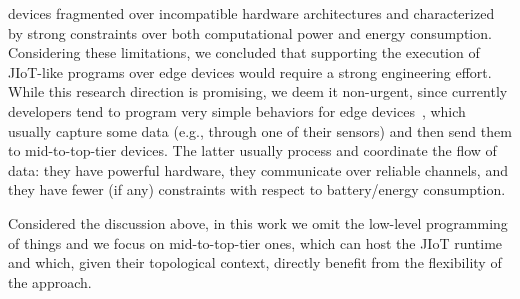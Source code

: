 devices fragmented over incompatible hardware architectures and characterized by
strong constraints over both computational power and energy consumption.
Considering these limitations, we concluded that supporting the execution of
JIoT-like programs over edge devices would require a strong engineering effort.
While this research direction is promising, we deem it non-urgent, since
currently developers tend to program very simple behaviors for edge
devices~\cite{7123563}, which usually capture some data (e.g., through one of
their sensors) and then send them to mid-to-top-tier devices. The latter usually
process and coordinate the flow of data: they have powerful hardware, they
communicate over reliable channels, and they have fewer (if any) constraints
with respect to battery/energy consumption.

Considered the discussion above, in this work we omit the low-level programming
of things and we focus on mid-to-top-tier ones, which can host the JIoT
runtime and which, given their topological context, directly benefit from the
flexibility of the approach.
